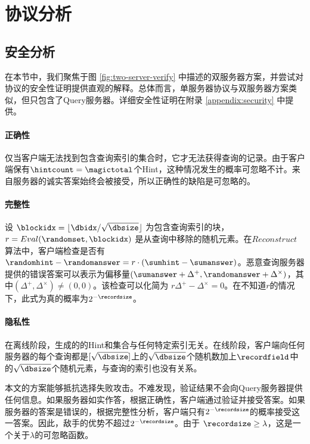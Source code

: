 \section{协议分析}

\subsection{安全分析}
在本节中，我们聚焦于图 \ref{fig:two-server-verify} 中描述的双服务器方案，并尝试对协议的安全性证明提供直观的解释。总体而言，单服务器协议与双服务器方案类似，但只包含了Query服务器。详细安全性证明在附录 \ref{appendix:security} 中提供。

\paragraph{正确性}
仅当客户端无法找到包含查询索引的集合时，它才无法获得查询的记录。由于客户端保有$\hintcount = \magictotal$个Hint，这种情况发生的概率可忽略不计。来自服务器的诚实答案始终会被接受，所以正确性的缺陷是可忽略的。

\paragraph{完整性}
设 $\blockidx = \lfloor \dbidx / \sqrt{\dbsize} \rfloor$ 为包含查询索引的块，$r = Eval(\randomset, \blockidx)$ 是从查询中移除的随机元素。在$Reconstruct$算法中，客户端检查是否有$\randomhint-\randomanswer = r \cdot (\sumhint-\sumanswer)$。恶意查询服务器提供的错误答案可以表示为偏移量$(\sumanswer+\Delta^+, \randomanswer+\Delta^\times)$，其中$(\Delta^+, \Delta^\times) \neq (0, 0)$。该检查可以化简为 $r\Delta^+ - \Delta^\times = 0$。在不知道$r$的情况下，此式为真的概率为$2^{-\recordsize}$。

\paragraph{隐私性}
在离线阶段，生成的的Hint和集合与任何特定索引无关。在线阶段，客户端向任何服务器的每个查询都是$[\sqrt{\dbsize}]$上的$\sqrt{\dbsize}$个随机数加上$\recordfield$中的$\sqrt{\dbsize}$个随机元素，与查询的索引也没有关系。

本文的方案能够抵抗选择失败攻击。不难发现，验证结果不会向Query服务器提供任何信息。如果服务器如实作答，根据正确性，客户端通过验证并接受答案。如果服务器的答案是错误的，根据完整性分析，客户端只有$2^{-\recordsize}$的概率接受这一答案。因此，敌手的优势不超过$2^{-\recordsize}$。由于 $\recordsize \ge \lambda$，这是一个关于$\lambda$的可忽略函数。

